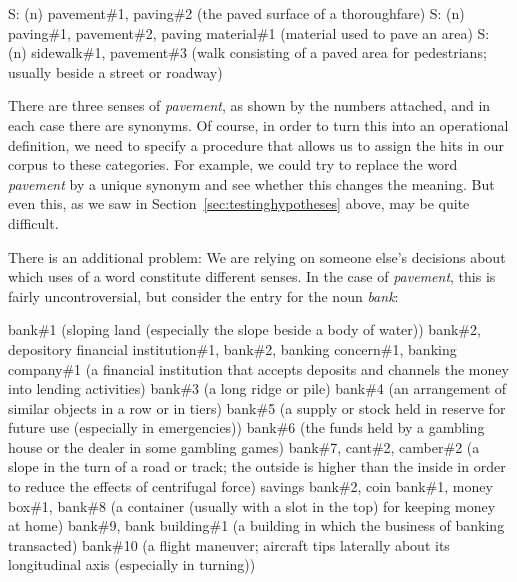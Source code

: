 \begin{exe}
\ex
\begin{xlist}
\label{ex:wordnetpavement}
\ex S: (n) pavement\#1, paving\#2 (the paved surface of a thoroughfare)
\ex S: (n) paving\#1, pavement\#2, paving material\#1 (material used to pave an area)
\ex S: (n) sidewalk\#1, pavement\#3 (walk consisting of a paved area for pedestrians; usually beside a street or roadway)
\end{xlist}
\end{exe}

There are three senses of \textit{pavement}, as shown by the numbers attached, and in each case there are synonyms.  Of course, in order to turn this into an operational  definition, we need to specify a procedure that allows us to assign the hits  in our corpus to these categories.  For example, we could try to replace the word \textit{pavement} by a unique synonym and see whether this changes the meaning.  But even this, as we saw in Section~\ref{sec:testinghypotheses} above, may be quite difficult.

There is an additional problem: We are relying on someone else's decisions about which uses of a word constitute different senses. In the case of \textit{pavement}, this is fairly uncontroversial, but consider the entry for the noun  \textit{bank}:

\begin{exe}
\ex
\begin{xlist}
\label{ex:wordnetbank}
\ex bank\#1 (sloping land (especially the slope beside a body of water))
\ex bank\#2, depository financial institution\#1, bank\#2, banking concern\#1, banking company\#1 (a financial institution that accepts deposits and channels the money into lending activities)
\ex bank\#3 (a long ridge or pile)
\ex bank\#4 (an arrangement of similar objects in a row or in tiers)
\ex bank\#5 (a supply or stock held in reserve for future use (especially in emergencies))
\ex bank\#6 (the funds held by a gambling house or the dealer in some gambling games)
\ex bank\#7, cant\#2, camber\#2 (a slope in the turn of a road or track; the outside is higher than the inside in order to reduce the effects of centrifugal force)
\ex savings bank\#2, coin bank\#1, money box\#1, bank\#8 (a container (usually with a slot in the top) for keeping money at home)
\ex bank\#9, bank building\#1 (a building in which the business of banking transacted)
\ex bank\#10 (a flight maneuver; aircraft tips laterally about its longitudinal axis (especially in turning))
\end{xlist}
\end{exe}

